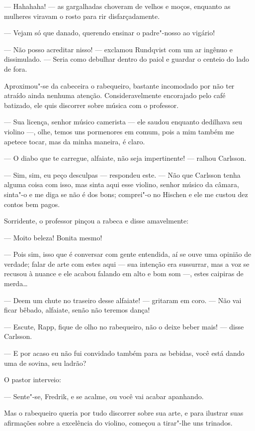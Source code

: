 --- Hahahaha! --- as gargalhadas choveram de velhos e moços, enquanto as mulheres
viravam o rosto para rir disfarçadamente.

--- Vejam só que danado, querendo ensinar o padre"-nosso ao vigário!

--- Não posso acreditar nisso! --- exclamou Rundqvist com um ar
ingênuo e dissimulado. --- Seria como debulhar dentro do paiol e 
guardar o centeio do lado de fora.

Aproximou"-se da cabeceira o rabequeiro, bastante incomodado por
não ter atraído ainda nenhuma atenção. Consideravelmente 
encorajado pelo café batizado, ele quis discorrer sobre música com o professor.

--- Sua licença, senhor músico camerista --- ele saudou enquanto dedilhava seu
violino ---, olhe, temos uns pormenores em comum, pois a mim também me apetece
tocar, mas da minha maneira, é claro.

--- O diabo que te carregue, alfaiate, não seja impertinente! --- ralhou Carlsson. 

--- Sim, sim, eu peço desculpas --- respondeu este. --- Não que Carlsson
tenha alguma coisa com isso, mas sinta aqui esse violino, senhor músico da
câmara, sinta"-o e me diga se não é dos bons; comprei"-o no Hischen e ele me
custou dez contos bem pagos.

Sorridente, o professor pinçou a rabeca e disse amavelmente:

--- Moito beleza! Bonita mesmo!

--- Pois sim, isso que é conversar com gente entendida, aí se ouve uma 
opinião de verdade; falar de arte com estes aqui --- sua intenção era sussurrar, mas a voz
se recusou à nuance e ele acabou falando em alto e bom som ---, estes caipiras de
merda\ldots{}

--- Deem um chute no traseiro desse alfaiate! --- gritaram em coro. --- Não vai
ficar bêbado, alfaiate, senão não teremos dança!

--- Escute, Rapp, fique de olho no rabequeiro, não o deixe beber mais! --- disse Carlsson.

--- E por acaso eu não fui convidado também para as bebidas, você está dando uma
de sovina, seu ladrão?

O pastor interveio:

--- Sente"-se, Fredrik, e se acalme, ou você vai acabar apanhando.

Mas o rabequeiro queria por tudo discorrer sobre sua arte, e para ilustrar suas
afirmações sobre a excelência do violino, começou a tirar"-lhe uns trinados.

